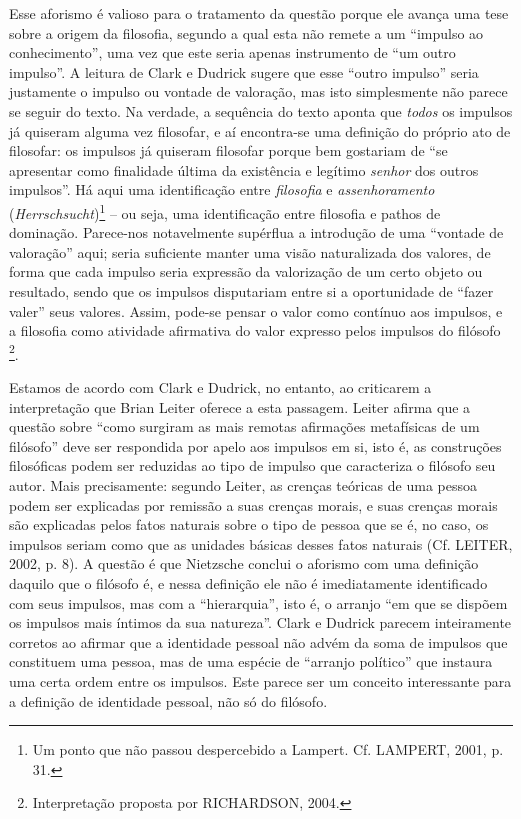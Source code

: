 \documentclass[
	12pt,				%
	openright,			%
	oneside,			%
	a4paper,			%
	english,			%
	french,				%
	spanish,			%
	brazil				%
	]{abntex2}
\begin{document}
Esse aforismo é valioso para o tratamento da questão porque ele avança uma tese sobre a origem da filosofia, segundo a qual esta não remete a um “impulso ao conhecimento”, uma vez que este seria apenas instrumento de “um outro impulso”. A leitura de Clark e Dudrick sugere que esse “outro impulso” seria justamente o impulso ou vontade de valoração, mas isto simplesmente não parece se seguir do texto. Na verdade, a sequência do texto aponta que \textit{todos} os impulsos já quiseram alguma vez filosofar, e aí encontra-se uma definição do próprio ato de filosofar: os impulsos já quiseram filosofar porque bem gostariam de “se apresentar como finalidade última da existência e legítimo \textit{senhor} dos outros impulsos”. Há aqui uma identificação entre \textit{filosofia} e \textit{assenhoramento} (\textit{Herrschsucht})\footnote{Um ponto que não passou despercebido a Lampert. Cf. LAMPERT, 2001, p. 31.} – ou seja, uma identificação entre filosofia e pathos de dominação. Parece-nos notavelmente supérflua a introdução de uma “vontade de valoração” aqui; seria suficiente manter uma visão naturalizada dos valores, de forma que cada impulso seria expressão da valorização de um certo objeto ou resultado, sendo que os impulsos disputariam entre si a oportunidade de “fazer valer” seus valores. Assim, pode-se pensar o valor como contínuo aos impulsos, e a filosofia como atividade afirmativa do valor expresso pelos impulsos do filósofo
\footnote{Interpretação proposta por RICHARDSON, 2004.}. 

	Estamos de acordo com Clark e Dudrick, no entanto, ao criticarem a interpretação que Brian Leiter oferece a esta passagem. Leiter afirma que a questão sobre “como surgiram as mais remotas afirmações metafísicas de um filósofo” deve ser respondida por apelo aos impulsos em si, isto é, as construções filosóficas podem ser reduzidas ao tipo de impulso que caracteriza o filósofo seu autor. Mais precisamente: segundo Leiter, as crenças teóricas de uma pessoa podem ser explicadas por remissão a suas crenças morais, e suas crenças morais são explicadas pelos fatos naturais sobre o tipo de pessoa que se é, no caso, os impulsos seriam como que as unidades básicas desses fatos naturais (Cf. LEITER, 2002, p. 8). A questão é que Nietzsche conclui o aforismo com uma definição daquilo que o filósofo é, e nessa definição ele não é imediatamente identificado com seus impulsos, mas com a “hierarquia”, isto é, o arranjo “em que se dispõem os impulsos mais íntimos da sua natureza”. Clark e Dudrick parecem inteiramente corretos ao afirmar que a identidade pessoal não advém da soma de impulsos que constituem uma pessoa, mas de uma espécie de “arranjo político” que instaura uma certa ordem entre os impulsos. Este parece ser um conceito interessante para a definição de identidade pessoal, não só do filósofo.
\end{document}
